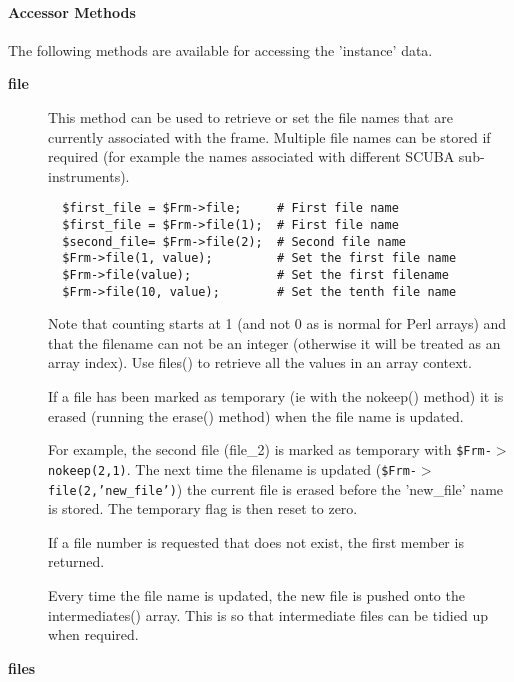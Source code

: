 \paragraph*{Accessor Methods\label{ORAC::Frame_Accessor_Methods}}

The following methods are available for accessing the 
'instance' data.

\begin{description}
\item[\textbf{file}] \mbox{}

This method can be used to retrieve or set the file names that are 
currently associated with the frame. Multiple file names can be stored
if required (for example the names associated with different 
SCUBA sub-instruments).

\begin{verbatim}
  $first_file = $Frm->file;     # First file name
  $first_file = $Frm->file(1);  # First file name
  $second_file= $Frm->file(2);  # Second file name
  $Frm->file(1, value);         # Set the first file name
  $Frm->file(value);            # Set the first filename
  $Frm->file(10, value);        # Set the tenth file name
\end{verbatim}


Note that counting starts at 1 (and not 0 as is normal for Perl 
arrays) and that the filename can not be an integer (otherwise
it will be treated as an array index). Use files() to retrieve
all the values in an array context.



If a file has been marked as temporary (ie with the nokeep()
method) it is erased (running the erase() method) when the file
name is updated.



For example, the second file (file\_2) is marked as temporary
with \texttt{\$Frm-$>$nokeep(2,1)}. The next time the filename is updated
(\texttt{\$Frm-$>$file(2,'new\_file')}) the current file is erased before the
'new\_file' name is stored. The temporary flag is then reset to
zero.



If a file number is requested that does not exist, the first
member is returned.



Every time the file name is updated, the new file is pushed onto
the intermediates() array. This is so that intermediate files
can be tidied up when required.

\item[\textbf{files}] \mbox{}


\end{description}
